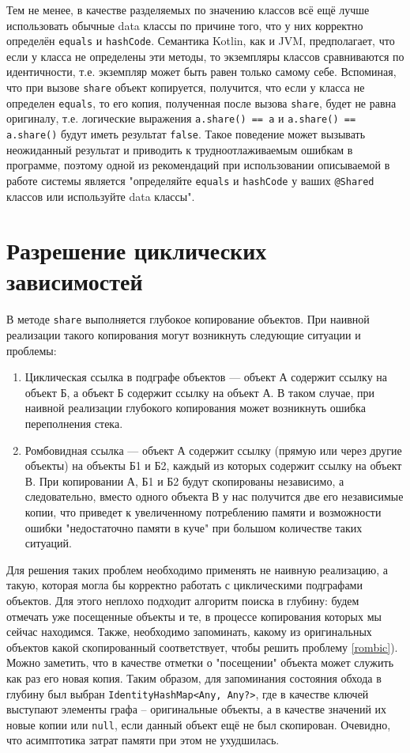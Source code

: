 \documentclass[specification,annotation,times]{itmo-student-thesis}
\begin{document}
Тем не менее, в качестве разделяемых по значению классов всё ещё лучше использовать обычные data классы по причине того, что у них корректно определён \texttt{equals} и \texttt{hashCode}. Семантика Kotlin, как и JVM, предполагает, что если у класса не определены эти методы, то экземпляры классов сравниваются по идентичности, т.е. экземпляр может быть равен только самому себе.
Вспоминая, что при вызове \texttt{share} объект копируется, получится, что если у класса не определен \texttt{equals}, то его копия, полученная после вызова \texttt{share}, будет не равна оригиналу, т.е. логические выражения \texttt{a.share() == a} и \texttt{a.share() == a.share()} будут иметь результат \texttt{false}.
Такое поведение может вызывать неожиданный результат и приводить к трудноотлаживаемым ошибкам в программе, поэтому одной из рекомендаций при использовании описываемой в работе системы является "определяйте \texttt{equals} и \texttt{hashCode} у ваших \texttt{@Shared} классов или используйте data классы".


\section{Разрешение циклических зависимостей}

В методе \texttt{share} выполняется глубокое копирование объектов. При наивной реализации такого копирования могут возникнуть следующие ситуации и проблемы:

\begin{enumerate}
	\item Циклическая ссылка в подграфе объектов --- объект А содержит ссылку на объект Б, а объект Б содержит ссылку на объект А. В таком случае, при наивной реализации глубокого копирования может возникнуть ошибка переполнения стека.
	\item \label{rombic} Ромбовидная ссылка --- объект А содержит ссылку (прямую или через другие объекты) на объекты Б1 и Б2, каждый из которых содержит ссылку на объект В. При копировании А, Б1 и Б2 будут скопированы независимо, а следовательно, вместо одного объекта В у нас получится две его независимые копии, что приведет к увеличенному потреблению памяти и возможности ошибки "недостаточно памяти в куче" при большом количестве таких ситуаций.
\end{enumerate}

Для решения таких проблем необходимо применять не наивную реализацию,
а такую, которая могла бы корректно работать с циклическими подграфами объектов.
Для этого неплохо подходит алгоритм поиска в глубину: будем отмечать уже посещенные объекты и те, в процессе копирования которых мы сейчас находимся.
Также, необходимо запоминать, какому из оригинальных объектов какой скопированный соответствует, чтобы решить проблему \ref{rombic}). 
Можно заметить, что в качестве отметки о "посещении" объекта может служить как раз его новая копия.
Таким образом, для запоминания состояния обхода в глубину был выбран \texttt{IdentityHashMap<Any, Any?>}, где в качестве ключей выступают элементы графа -- оригинальные объекты, а в качестве значений их новые копии или \texttt{null}, если данный объект ещё не был скопирован.
Очевидно, что асимптотика затрат памяти при этом не ухудшилась.
\end{document}
